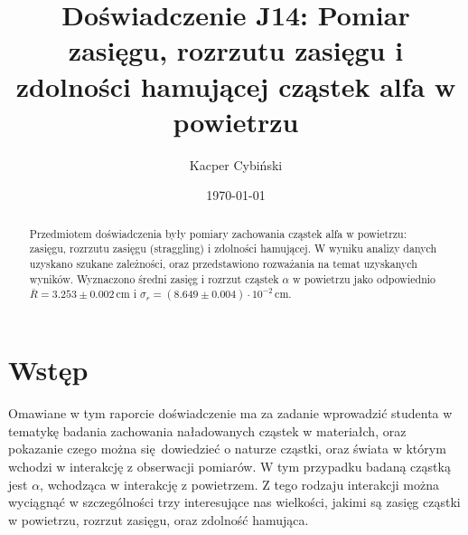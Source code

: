 \documentclass[pra,
superscriptaddress,
amssymb,amsmath,amsmath,showpacs,reprint,twocolumn]{revtex4-1}
\begin{document}
\title{Doświadczenie J14: Pomiar zasięgu, rozrzutu zasięgu i zdolności hamującej cząstek alfa w powietrzu}
\author{\sc Kacper Cybiński}
\date{\today}



\begin{abstract}
    Przedmiotem doświadczenia były pomiary zachowania cząstek alfa w powietrzu: zasięgu, rozrzutu zasięgu (straggling) i zdolności hamującej. W wyniku analizy danych uzyskano szukane zależności, oraz przedstawiono rozważania na temat uzyskanych wyników. Wyznaczono średni zasięg i rozrzut cząstek $\alpha$ w powietrzu jako odpowiednio $\bar{R} = 3.253 \pm 0.002$\,cm i $\sigma_r = (8.649 \pm 0.004)\cdot 10^{-2}$\,cm.
\end{abstract}

\maketitle

\section{Wstęp}


Omawiane w tym raporcie doświadczenie ma za zadanie wprowadzić studenta w tematykę badania zachowania naładowanych cząstek w materiałch, oraz pokazanie czego można się dowiedzieć o naturze cząstki, oraz świata w którym wchodzi w interakcję z obserwacji pomiarów. W tym przypadku badaną cząstką jest $\alpha$, wchodząca w interakcję z powietrzem. Z tego rodzaju interakcji można wyciągnąć w szczególności trzy interesujące nas wielkości, jakimi są zasięg cząstki w powietrzu, rozrzut zasięgu, oraz zdolność hamująca.   
\end{document}
